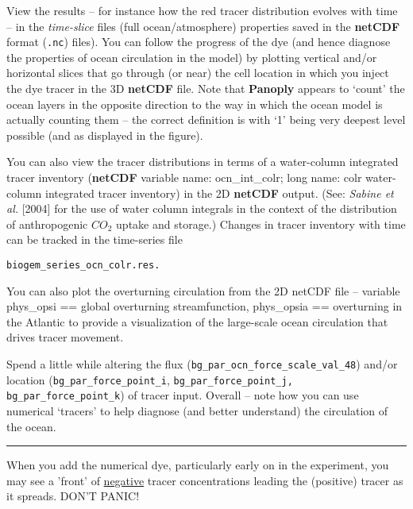 \documentclass[11pt,fleqn]{book} %
\begin{document}
View the results – for instance how the red tracer distribution evolves with time – in the \textit{time-slice} files (full ocean/atmosphere) properties saved in the \textbf{netCDF} format (\texttt{.nc}) files). You can follow the progress of the dye (and hence diagnose the properties of ocean circulation in the model) by plotting vertical and/or horizontal slices that go through (or near) the cell location in which you inject the dye tracer in the 3D \textbf{netCDF} file. Note that \textbf{Panoply} appears to ‘count’ the ocean layers in the opposite direction to the way in which the ocean model is actually counting them – the correct definition is with ‘1’ being very deepest level possible (and as displayed in the figure).

You can also view the tracer distributions in terms of a water-column integrated tracer inventory (\textbf{netCDF} variable name: \textsf{\footnotesize ocn\_int\_colr}; long name: \textsf{\footnotesize colr water-column integrated tracer inventory}) in the 2D \textbf{netCDF} output. (See: \textit{Sabine et al.} [2004] for the use of water column integrals in the context of the distribution of anthropogenic \(CO_{2}\) uptake and storage.) Changes in tracer inventory with time can be tracked in the time-series file
\vspace{-2mm}
\begin{verbatim}
biogem_series_ocn_colr.res.
\end{verbatim}
\vspace{-2mm}

You can also plot the overturning circulation from the 2D netCDF file – variable phys\_opsi == global overturning streamfunction, \textsf{\footnotesize phys\_opsia} == overturning in the Atlantic to provide a visualization of the large-scale ocean circulation that drives tracer movement.

Spend a little while altering the flux (\texttt{bg\_par\_ocn\_force\_scale\_val\_48}) and/or location (\texttt{bg\_par\_force\_point\_i}, \texttt{bg\_par\_force\_point\_j, bg\_par\_force\_point\_k}) of tracer input. Overall -- note how you can use numerical ‘tracers’ to help diagnose (and better understand) the circulation of the ocean.

\vspace{1mm}
\noindent\rule{4cm}{0.5pt}
\vspace{2mm}

\noindent When you add the numerical dye, particularly early on in the experiment, you may see a 'front' of \uline{negative} tracer concentrations leading the (positive) tracer as it spreads. DON'T PANIC!
\end{document}
